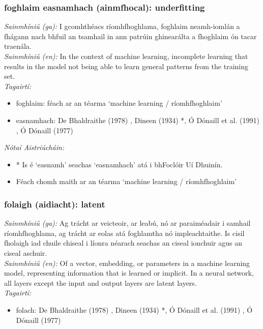 \subsubsection*{foghlaim easnamhach (ainmfhocal): underfitting}
 \noindent \textit{Sainmhíniú (ga):} I gcomhthéacs ríomhfhoghlama, foghlaim neamh-iomlán a fhágann nach bhfuil an tsamhail in ann patrúin ghinearálta a fhoghlaim ón tacar traenála.
\\
 \noindent \textit{Sainmhíniú (en):} In the context of machine learning, incomplete learning that results in the model not being able to learn general patterns from the training set.
\\
 \noindent \textit{Tagairtí:}
\begin{itemize}
	\item foghlaim: féach ar an téarma `machine learning / ríomhfhoghlaim'
	\item easnamhach: De Bhaldraithe (1978) \cite{de-bhaldraithe}, Dineen (1934) \cite{dineen}*, Ó Dónaill et al. (1991) \cite{focloir-beag}, Ó Dónaill (1977) \cite{odonaill}
\end{itemize}

 \noindent \textit{Nótaí Aistriúcháin:}
\begin{itemize}
	\item * Is é `easnamh' seachas `easnamhach' atá i bhFoclóir Uí Dhuinín.
	\item Féach chomh maith ar an téarma `machine learning / ríomhfhoghlaim'
\end{itemize}


\subsubsection*{folaigh (aidiacht): latent}
 \noindent \textit{Sainmhíniú (ga):} Ag trácht ar veicteoir, ar leabú, nó ar paraiméadair i samhail ríomhfhoghlama, ag trácht ar eolas atá foghlamtha nó impleachtaithe. Is cisil fholaigh iad chuile chiseal i líonra néarach seachas an ciseal ionchuir agus an ciseal aschuir.
\\
 \noindent \textit{Sainmhíniú (en):} Of a vector, embedding, or parameters in a machine learning model, representing information that is learned or implicit. In a neural network, all layers except the input and output layers are latent layers.
\\
 \noindent \textit{Tagairtí:}
\begin{itemize}
	\item folach: De Bhaldraithe (1978) \cite{de-bhaldraithe}, Dineen (1934) \cite{dineen}*, Ó Dónaill et al. (1991) \cite{focloir-beag}, Ó Dónaill (1977) \cite{odonaill}
\end{itemize}

